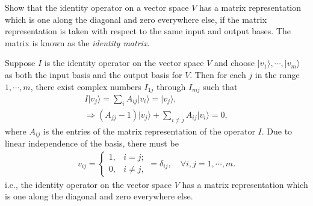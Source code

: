 \documentclass[en]{sol-man}
\begin{document}
\begin{exe}
    Show that the identity operator on a vector space $V$ has a matrix representation which is one along the diagonal and zero everywhere else, if the matrix representation is taken with respect to the same input and output bases. The matrix is known as the \emph{identity matrix}.
\end{exe}
\begin{sol}
    Suppose $I$ is the identity operator on the vector space $V$ and choose $\lvert v_1\rangle,\cdots,\lvert v_m\rangle$ as both the input basis and the output basis for $V$. Then for each $j$ in the range $1,\cdots,m$, there exist complex numbers $I_{1j}$ through $I_{mj}$ such that
    \begin{gather}
        I\lvert v_j\rangle=\sum_iA_{ij}\lvert v_i\rangle=\lvert v_j\rangle,\\
        \Longrightarrow(A_{jj}-1)\lvert v_j\rangle+\sum_{i\neq j}A_{ij}\lvert v_i\rangle=0,
    \end{gather}
    where $A_{ij}$ is the entries of the matrix representation of the operator $I$. Due to linear independence of the basis, there must be
    \begin{align}
        v_{ij}=\left\{\begin{array}{ll}
            1,&i=j;\\
            0,&i\neq j,
        \end{array}\right.=\delta_{ij},\quad\forall i,j=1,\cdots,m.
    \end{align}
    i.e., the identity operator on the vector space $V$ has a matrix representation which is one along the diagonal and zero everywhere else.
\end{sol}
\end{document}
